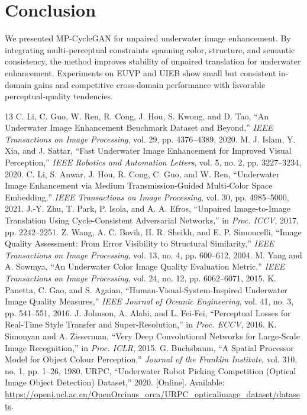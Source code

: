 \documentclass{IEEEtran}
\begin{document}
\section{Conclusion}
We presented MP-CycleGAN for unpaired underwater image enhancement. By integrating multi-perceptual constraints spanning color, structure, and semantic consistency, the method improves stability of unpaired translation for underwater enhancement. Experiments on EUVP and UIEB show small but consistent in-domain gains and competitive cross-domain performance with favorable perceptual-quality tendencies.
\begin{thebibliography}{13}
 C. Li, C. Guo, W. Ren, R. Cong, J. Hou, S. Kwong, and D. Tao, ``An Underwater Image Enhancement Benchmark Dataset and Beyond,'' \emph{IEEE Transactions on Image Processing}, vol. 29, pp. 4376--4389, 2020.
 M. J. Islam, Y. Xia, and J. Sattar, ``Fast Underwater Image Enhancement for Improved Visual Perception,'' \emph{IEEE Robotics and Automation Letters}, vol. 5, no. 2, pp. 3227--3234, 2020.
 C. Li, S. Anwar, J. Hou, R. Cong, C. Guo, and W. Ren, ``Underwater Image Enhancement via Medium Transmission-Guided Multi-Color Space Embedding,'' \emph{IEEE Transactions on Image Processing}, vol. 30, pp. 4985--5000, 2021.
 J.-Y. Zhu, T. Park, P. Isola, and A. A. Efros, ``Unpaired Image-to-Image Translation Using Cycle-Consistent Adversarial Networks,'' in \emph{Proc. ICCV}, 2017, pp. 2242--2251.
 Z. Wang, A. C. Bovik, H. R. Sheikh, and E. P. Simoncelli, ``Image Quality Assessment: From Error Visibility to Structural Similarity,'' \emph{IEEE Transactions on Image Processing}, vol. 13, no. 4, pp. 600--612, 2004.
 M. Yang and A. Sowmya, ``An Underwater Color Image Quality Evaluation Metric,'' \emph{IEEE Transactions on Image Processing}, vol. 24, no. 12, pp. 6062--6071, 2015.
 K. Panetta, C. Gao, and S. Agaian, ``Human-Visual-System-Inspired Underwater Image Quality Measures,'' \emph{IEEE Journal of Oceanic Engineering}, vol. 41, no. 3, pp. 541--551, 2016.
 J. Johnson, A. Alahi, and L. Fei-Fei, ``Perceptual Losses for Real-Time Style Transfer and Super-Resolution,'' in \emph{Proc. ECCV}, 2016.
 K. Simonyan and A. Zisserman, ``Very Deep Convolutional Networks for Large-Scale Image Recognition,'' in \emph{Proc. ICLR}, 2015.
 G. Buchsbaum, ``A Spatial Processor Model for Object Colour Perception,'' \emph{Journal of the Franklin Institute}, vol. 310, no. 1, pp. 1--26, 1980.
 URPC, ``Underwater Robot Picking Competition (Optical Image Object Detection) Dataset,'' 2020. [Online]. Available: \url{https://openi.pcl.ac.cn/OpenOrcinus_orca/URPC_opticalimage_dataset/datasets}.
\end{thebibliography}
\end{document}
